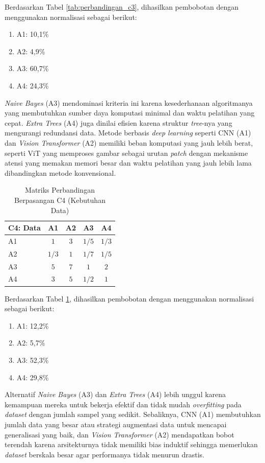 \begin{enumerate}
	Berdasarkan Tabel \ref{tab:perbandingan_c3}, dihasilkan pembobotan dengan menggunakan normalisasi sebagai berikut:
	\begin{enumerate}
		\item A1: 10,1\%
		\item A2: 4,9\%
		\item A3: 60,7\%
		\item A4: 24,3\%\\
	\end{enumerate}
	
	\textit{Naive Bayes} (A3) mendominasi kriteria ini karena kesederhanaan algoritmanya yang membutuhkan sumber daya komputasi minimal dan waktu pelatihan yang cepat. \textit{Extra Trees} (A4) juga dinilai efisien karena struktur \textit{tree}-nya yang mengurangi redundansi data. Metode berbasis \textit{deep learning} seperti CNN (A1) dan \textit{Vision Transformer} (A2) memiliki beban komputasi yang jauh lebih berat, seperti ViT yang memproses gambar sebagai urutan \textit{patch} dengan mekanisme atensi yang memakan memori besar dan waktu pelatihan yang jauh lebih lama dibandingkan metode konvensional.
	
	\begin{table}[H]
		\centering
		\caption{Matriks Perbandingan Berpasangan C4 (Kebutuhan Data)}
		\label{tab:perbandingan_c4}
		\begin{tabular}{|l|c|c|c|c|}
			\hline
			C4: Data & A1 & A2 & A3 & A4 \\ \hline
			A1 & $1$ & $3$ & $1/5$ & $1/3$ \\ \hline
			A2 & $1/3$ & $1$ & $1/7$ & $1/5$ \\ \hline
			A3 & $5$ & $7$ & $1$ & $2$ \\ \hline
			A4 & $3$ & $5$ & $1/2$ & $1$ \\ \hline
		\end{tabular}
	\end{table}
	
	Berdasarkan Tabel \ref{tab:perbandingan_c4}, dihasilkan pembobotan dengan menggunakan normalisasi sebagai berikut:
	\begin{enumerate}
		\item A1: 12,2\%
		\item A2: 5,7\%
		\item A3: 52,3\%
		\item A4: 29,8\%\\
	\end{enumerate}
	
	Alternatif \textit{Naive Bayes} (A3) dan \textit{Extra Trees} (A4) lebih unggul karena kemampuan mereka untuk bekerja efektif dan tidak mudah \textit{overfitting} pada \textit{dataset} dengan jumlah sampel yang sedikit. Sebaliknya, CNN (A1) membutuhkan jumlah data yang besar atau strategi augmentasi data untuk mencapai generalisasi yang baik, dan \textit{Vision Transformer} (A2) mendapatkan bobot terendah karena arsitekturnya tidak memiliki bias induktif sehingga memerlukan \textit{dataset} berskala besar agar performanya tidak menurun drastis.
	

\end{enumerate}
